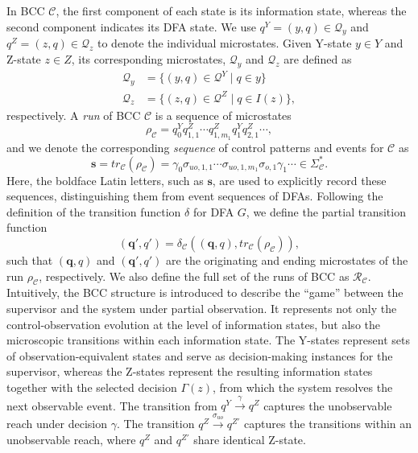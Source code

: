 \documentclass[journal,twoside,web]{ieeecolor}
\begin{document}
%
In BCC $\mathcal{C}$, the first component of each state is its information state, whereas the second component indicates its DFA state. 
We use $q^Y = (y, q) \in \bm{\mathcal{Q}}_y$ and $q^Z = (z, q) \in \bm{\mathcal{Q}}_z$ to denote the individual microstates.
Given Y-state $y \in Y$ and Z-state $z \in Z$, its corresponding microstates, $\bm{\mathcal{Q}}_y$ and $\bm{\mathcal{Q}}_z$ are defined as 
$$
\begin{aligned}
    \bm{\mathcal Q}_y &= \{ (y,q) \in \bm{\mathcal Q}^Y \mid q \in y \} \\
    \bm{\mathcal Q}_z &= \{ (z,q) \in \bm{\mathcal Q}^Z \mid q \in I(z) \},
\end{aligned}
$$
%
respectively.
A \emph{run} of BCC $\mathcal{C}$ is a sequence of microstates
\begin{equation}\label{eq:bcc_run}
    \rho_\mathcal{C} = q_0^Y q_{1,1}^Z \cdots q_{1,m_1}^Z q_1^Y q_{2,1}^Z \cdots,
\end{equation}
and we denote the corresponding \emph{sequence} of control patterns and events for $\mathcal{C}$ as
$$
\bm{s} = tr_\mathcal{C}(\rho_\mathcal{C}) = \gamma_0 \sigma_{uo,1,1} \cdots \sigma_{uo,1,m_1} \sigma_{o,1} \gamma_1 \cdots \in \Sigma_\mathcal{C}^*.
$$
Here, the boldface Latin letters, such as $\bm{s}$, are used to explicitly record these sequences, distinguishing them from event sequences of DFAs.
%
Following the definition of the transition function $\delta$ for DFA $G$, we define the partial transition function
$$
(\bm{q}', q') = \delta_\mathcal{C}((\bm{q}, q), tr_\mathcal{C}(\rho_\mathcal{C})),
$$ 
such that $(\bm{q}, q)$ and $(\bm{q}', q')$ are the originating and ending microstates of the run $\rho_\mathcal{C}$, respectively.
We also define the full set of the runs of BCC as $\mathcal{R}_\mathcal{C}$.
%
Intuitively, the BCC structure is introduced to describe the ``game'' between the supervisor and the system under partial observation. 
%
It represents not only the control-observation evolution at the level of information states, but also the microscopic transitions within each information state.
The Y-states represent sets of observation-equivalent states and serve as decision-making instances for the supervisor, whereas the Z-states represent the resulting information states together with the selected decision $\Gamma(z)$, from which the system resolves the next observable event.
%
The transition from $q^Y \xrightarrow{\gamma} q^Z$ captures the unobservable reach under decision $\gamma$.
The transition $q^Z \xrightarrow{\sigma_{uo}} q^{Z\prime}$ captures the transitions within an unobservable reach, where $q^Z$ and $q^{Z\prime}$ share identical Z-state.
\end{document}

